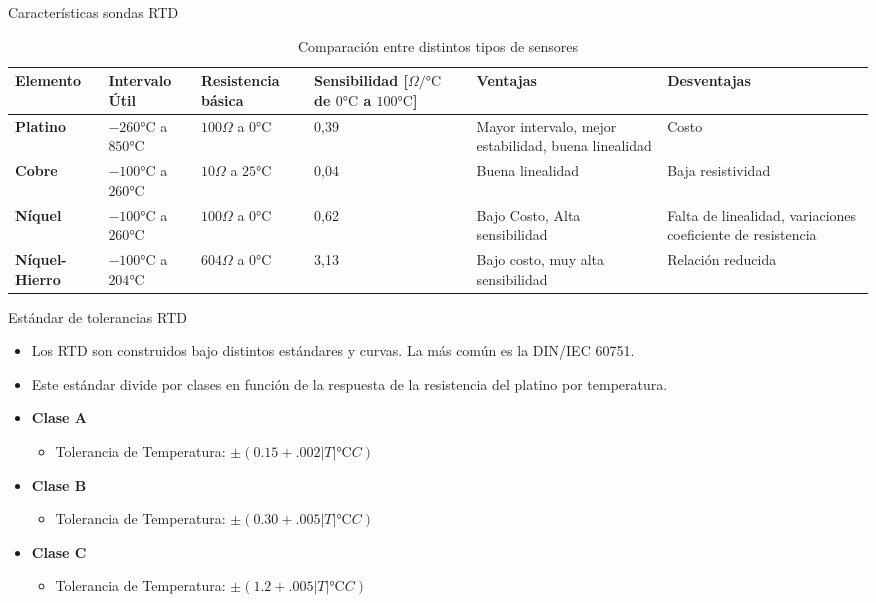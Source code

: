 \documentclass[aspectratio=169]{beamer}
\begin{document}
\begin{frame}{Características sondas RTD}
  \begin{table}[]
    \centering
    \scriptsize{
    \begin{tabular}{m{1.1cm} m{2.2cm} m{1.5cm} m{1.8cm} m{2.6cm} m{2.6cm}}
    \toprule
        \textbf{Elemento} & \textbf{Intervalo Útil} &\textbf{Resistencia básica} & \textbf{Sensibilidad [$\Omega/\si{\celsius}$ de $0\si{\celsius}$ a $100\si{\celsius}$]} & \textbf{Ventajas} & \textbf{Desventajas}\\
    \midrule
       \textbf{Platino} & $-260\si{\celsius}$ a $ 850\si{\celsius}$ & $100\Omega$ a $0\si{\celsius}$   & 0,39 & Mayor intervalo, mejor estabilidad, buena linealidad & Costo\\
       \textbf{Cobre} & $-100\si{\celsius}$ a $ 260\si{\celsius}$ & $10\Omega$ a $25\si{\celsius}$   & 0,04 & Buena linealidad & Baja resistividad\\
       \textbf{Níquel} &  $-100\si{\celsius}$ a $ 260\si{\celsius}$ & $100\Omega$ a $0\si{\celsius}$   & 0,62 & Bajo Costo, Alta sensibilidad & Falta de linealidad, variaciones coeficiente de resistencia\\
       \textbf{Níquel-Hierro} & $-100\si{\celsius}$ a $ 204\si{\celsius}$ & $604\Omega$ a $0\si{\celsius}$   & 3,13 & Bajo costo, muy alta sensibilidad & Relación reducida\\
    \bottomrule
    \end{tabular}
    }
    \caption{Comparación entre distintos tipos de sensores\cite{sole2005instrumentacion}}
    \label{tab:Caracteristicas _rtd}
\end{table}
\end{frame}

\begin{frame}{Estándar de tolerancias RTD}
 \begin{itemize}
     \item Los RTD son construidos bajo distintos estándares y curvas. La más común es la DIN/IEC 60751.
     \item Este estándar divide por clases en función de la respuesta de la resistencia del platino por temperatura. 
     \item \textbf{Clase A}
     \begin{itemize}
         \item Tolerancia de Temperatura: $\pm (0.15 + .002|T| \si{\celsius} C)$
     \end{itemize}
      \item \textbf{Clase B}
     \begin{itemize}
         \item Tolerancia de Temperatura: $\pm (0.30 + .005|T| \si{\celsius} C)$
         \end{itemize}
    \item \textbf{Clase C}
     \begin{itemize}
         \item Tolerancia de Temperatura: $\pm (1.2 + .005|T| \si{\celsius} C)$
     \end{itemize}
 \end{itemize}
\end{frame}
\end{document}
